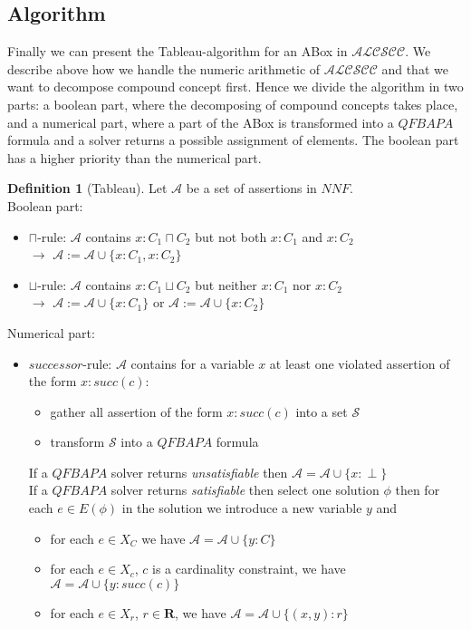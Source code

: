 \documentclass[a4paper,11pt]{scrartcl}
\theoremstyle{break}
\theoremstyle{definition}
\newtheorem{mydef}{Definition}
\begin{document}
\subsection{Algorithm}
Finally we can present the Tableau-algorithm for an ABox in $\mathcal{ALCSCC}$. We describe above how we handle the numeric arithmetic of $\mathcal{ALCSCC}$ and that we want to decompose compound concept first. Hence we divide the algorithm in two parts: a boolean part, where the decomposing of compound concepts takes place, and a numerical part, where a part of the ABox is transformed into a $QFBAPA$ formula and a solver returns a possible assignment of elements. The boolean part has a higher priority than the numerical part.
\begin{mydef}[Tableau]
Let $\mathcal{A}$ be a set of assertions in $NNF$.\\
Boolean part:
\begin{itemize}
\item\label{cap} $\sqcap$-rule: $\mathcal{A}$ contains $x:C_1\sqcap C_2$ but not both $x:C_1$ and $x:C_2$\\
$\rightarrow$ $\mathcal{A}:=\mathcal{A}\cup\{x:C_1, x:C_2\}$
\item\label{cup} $\sqcup$-rule: $\mathcal{A}$ contains $x:C_1\sqcup C_2$ but neither $x:C_1$ nor $x:C_2$\\
$\rightarrow$ $\mathcal{A}:=\mathcal{A}\cup\{x:C_1\}$ or $\mathcal{A}:=\mathcal{A}\cup\{x:C_2\}$
\end{itemize}
Numerical part:
\begin{itemize}
\item\label{succ} $successor$-rule: $\mathcal{A}$ contains for a variable $x$ at least one violated assertion of the form $x:succ(c)$:
\begin{itemize}
\item gather all assertion of the form $x:succ(c)$ into a set $\mathcal{S}$
\item transform $\mathcal{S}$ into a $QFBAPA$ formula
\end{itemize}
If a $QFBAPA$ solver returns \textit{unsatisfiable} then $\mathcal{A}=\mathcal{A}\cup\{x:\perp\}$\\
If a $QFBAPA$ solver returns \textit{satisfiable} then select one solution $\phi$ then for each $e\in E(\phi)$ in the solution we introduce a new variable $y$ and
\begin{itemize}
\item for each $e\in X_C$ we have $\mathcal{A}=\mathcal{A}\cup\{y:C\}$
\item for each $e\in X_{c}$, $c$ is a cardinality constraint, we have $\mathcal{A}=\mathcal{A}\cup\{y:succ(c)\}$
\item for each $e\in X_r$, $r\in\mathbf{R}$, we have $\mathcal{A}=\mathcal{A}\cup\{(x,y):r\}$
\end{itemize}
\end{itemize}
\end{mydef}
\end{document}
